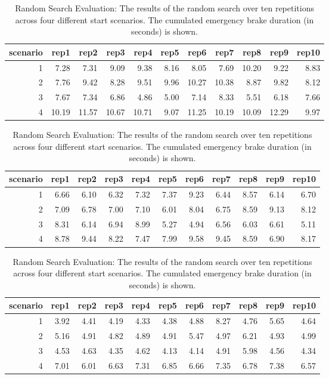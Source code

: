 \begin{table}
	\centering
	\begin{tabular}{ rrrrrrrrrrr }
		\hline
		scenario & rep1 & rep2 & rep3 & rep4 & rep5 & rep6 & rep7 & rep8 & rep9 & rep10\\
		\hline
		1 & 7.28 & 7.31 & 9.09 & 9.38 & 8.16 & 8.05 & 7.69 & 10.20 & 9.22 & 8.83 \\ 
		2 & 7.76 & 9.42 & 8.28 & 9.51 & 9.96 & 10.27 & 10.38 & 8.87 & 9.82 & 8.12 \\ 
		3 & 7.67 & 7.34 & 6.86 & 4.86 & 5.00 & 7.14 & 8.33 & 5.51 & 6.18 & 7.66 \\ 
		4 & 10.19 & 11.57 & 10.67 & 10.71 & 9.07 & 11.25 & 10.19 & 10.09 & 12.29 & 9.97 \\ 
		\hline
	\end{tabular}
	\caption{Optimized Genetic Algorithm Evaluation: The results of the optimized genetic algorithm over ten repetitions across four different start scenarios. The cumulated emergency brake duration (in seconds) is shown.}
	\label{tab:appendix:evaluation_optimized}
	
	\vspace{2em}
	\begin{tabular}{ rrrrrrrrrrr }
		\hline
		scenario & rep1 & rep2 & rep3 & rep4 & rep5 & rep6 & rep7 & rep8 & rep9 & rep10\\
		\hline
		1 & 6.66 & 6.10 & 6.32 & 7.32 & 7.37 & 9.23 & 6.44 & 8.57 & 6.14 & 6.70 \\
		2 & 7.09 & 6.78 & 7.00 & 7.10 & 6.01 & 8.04 & 6.75 & 8.59 & 9.13 & 8.12 \\ 
		3 & 8.31 & 6.14 & 6.94 & 8.99 & 5.27 & 4.94 & 6.56 & 6.03 & 6.61 & 5.11 \\ 
		4 & 8.78 & 9.44 & 8.22 & 7.47 & 7.99 & 9.58 & 9.45 & 8.59 & 6.90 & 8.17 \\ 
		\hline
	\end{tabular}
	\caption{Default Genetic Algorithm Evaluation: The results of the default genetic algorithm over ten repetitions across four different start scenarios. The cumulated emergency brake duration (in seconds) is shown.}
	\label{tab:appendix:evaluation_default}
	
	\vspace{2em}
	\begin{tabular}{ rrrrrrrrrrr }
		\hline
		scenario & rep1 & rep2 & rep3 & rep4 & rep5 & rep6 & rep7 & rep8 & rep9 & rep10\\
		\hline
		1 & 3.92 & 4.41 & 4.19 & 4.33 & 4.38 & 4.88 & 8.27 & 4.76 & 5.65 & 4.64 \\ 
		2 & 5.16 & 4.91 & 4.82 & 4.89 & 4.91 & 5.47 & 4.97 & 6.21 & 4.93 & 4.99 \\ 
		3 & 4.53 & 4.63 & 4.35 & 4.62 & 4.13 & 4.14 & 4.91 & 5.98 & 4.56 & 4.34 \\ 
		4 & 7.01 & 6.01 & 6.63 & 7.31 & 6.85 & 6.66 & 7.35 & 6.78 & 7.38 & 6.57 \\
		\hline
	\end{tabular}
	\caption{Random Search Evaluation: The results of the random search over ten repetitions across four different start scenarios. The cumulated emergency brake duration (in seconds) is shown.}
	\label{tab:appendix:evaluation_random}
\end{table}





